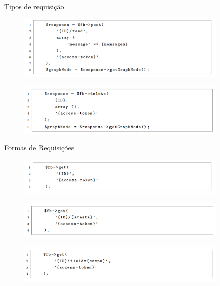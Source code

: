 \documentclass{aula-ifb}
\begin{document}
\begin{frame}{Tipos de requisição}
\begin{figure}[h]
\includegraphics[width=10cm]{figuras/requisicaopost.png}
\label{fig:facebookgraph}
\end{figure}
\begin{figure}[h]
\includegraphics[width=10cm]{figuras/requisicaodelete.png}
\label{fig:facebookgraph}
\end{figure}
\end{frame}

\begin{frame}{Formas de Requisições}
\begin{figure}[h]
\includegraphics[width=10cm]{figuras/requisicaovertice.png}
\label{fig:facebookgraph}
\end{figure}

\begin{figure}[h]
\includegraphics[width=10cm]{figuras/requisicaoaresta.png}
\label{fig:facebookgraph}
\end{figure}

\begin{figure}[h]
\includegraphics[width=10cm]{figuras/requisicaocampo.png}
\label{fig:facebookgraph}
\end{figure}
\end{frame}
\end{document}
